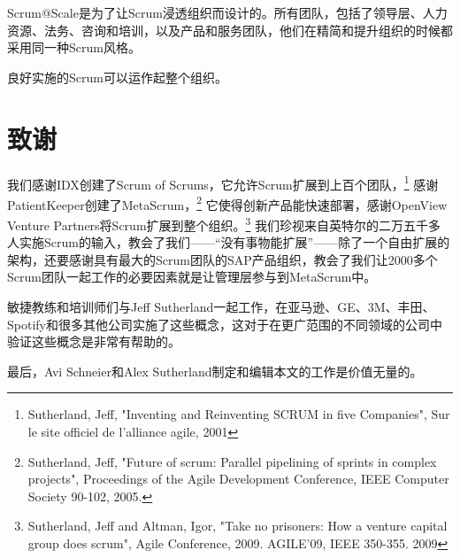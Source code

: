 \documentclass[12pt,a4paper,parskip=full]{scrartcl}
\begin{document}
\begin{CJK*}{UTF8}{gbsn}
Scrum@Scale是为了让Scrum浸透组织而设计的。所有团队，包括了领导层、人力资源、法务、咨询和培训，以及产品和服务团队，他们在精简和提升组织的时候都采用同一种Scrum风格。

良好实施的Scrum可以运作起整个组织。

\section{致谢}
我们感谢IDX创建了Scrum of Scrums，它允许Scrum扩展到上百个团队，\footnote{Sutherland, Jeff,
"Inventing and Reinventing SCRUM in five Companies", Sur le site officiel
de l'alliance agile, 2001} 感谢PatientKeeper创建了MetaScrum，\footnote{Sutherland, Jeff, "Future of scrum: Parallel pipelining
of sprints in complex projects", Proceedings of the Agile Development
Conference,  IEEE Computer Society 90-102,  2005.} 它使得创新产品能快速部署，感谢OpenView Venture Partners将Scrum扩展到整个组织。\footnote{Sutherland, Jeff and Altman,
Igor, "Take no prisoners: How a venture capital group does scrum", Agile
Conference, 2009. AGILE'09, IEEE 350-355.  2009} 我们珍视来自英特尔的二万五千多人实施Scrum的输入，教会了我们——“没有事物能扩展”——除了一个自由扩展的架构，还要感谢具有最大的Scrum团队的SAP产品组织，教会了我们让2000多个Scrum团队一起工作的必要因素就是让管理层参与到MetaScrum中。

敏捷教练和培训师们与Jeff Sutherland一起工作，在亚马逊、GE、3M、丰田、Spotify和很多其他公司实施了这些概念，这对于在更广范围的不同领域的公司中验证这些概念是非常有帮助的。

最后，Avi Schneier和Alex Sutherland制定和编辑本文的工作是价值无量的。

\pagebreak

\printbibliography

\clearpage\end{CJK*}
\end{document}
